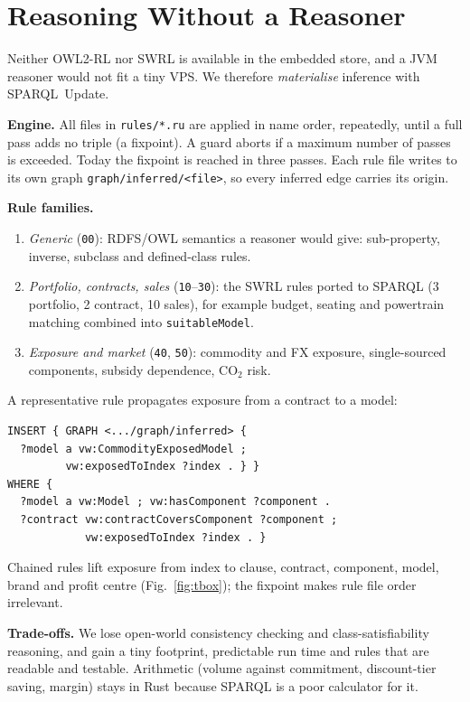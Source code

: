 \documentclass[conference]{IEEEtran}
\begin{document}
\section{Reasoning Without a Reasoner}
Neither OWL2-RL nor SWRL is available in the embedded store, and a JVM reasoner would not fit a tiny VPS. We therefore \emph{materialise} inference with SPARQL~Update.

\textbf{Engine.} All files in \texttt{rules/*.ru} are applied in name order, repeatedly, until a full pass adds no triple (a fixpoint). A guard aborts if a maximum number of passes is exceeded. Today the fixpoint is reached in three passes. Each rule file writes to its own graph \texttt{graph/inferred/<file>}, so every inferred edge carries its origin.

\textbf{Rule families.}
\begin{enumerate}
\item \emph{Generic} (\texttt{00}): RDFS/OWL semantics a reasoner would give: sub-property, inverse, subclass and defined-class rules.
\item \emph{Portfolio, contracts, sales} (\texttt{10}--\texttt{30}): the SWRL rules ported to SPARQL (3 portfolio, 2 contract, 10 sales), for example budget, seating and powertrain matching combined into \texttt{suitableModel}.
\item \emph{Exposure and market} (\texttt{40}, \texttt{50}): commodity and FX exposure, single-sourced components, subsidy dependence, CO$_2$ risk.
\end{enumerate}
A representative rule propagates exposure from a contract to a model:
\begin{lstlisting}
INSERT { GRAPH <.../graph/inferred> {
  ?model a vw:CommodityExposedModel ;
         vw:exposedToIndex ?index . } }
WHERE {
  ?model a vw:Model ; vw:hasComponent ?component .
  ?contract vw:contractCoversComponent ?component ;
            vw:exposedToIndex ?index . }
\end{lstlisting}
Chained rules lift exposure from index to clause, contract, component, model, brand and profit centre (Fig.~\ref{fig:tbox}); the fixpoint makes rule file order irrelevant.

\textbf{Trade-offs.} We lose open-world consistency checking and class-satisfiability reasoning, and gain a tiny footprint, predictable run time and rules that are readable and testable. Arithmetic (volume against commitment, discount-tier saving, margin) stays in Rust because SPARQL is a poor calculator for it.
\end{document}
